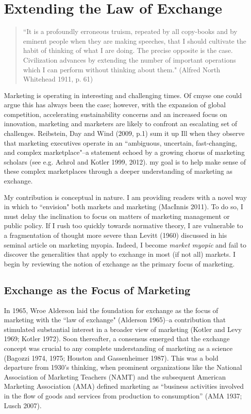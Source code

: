 \chapter{Extending the Law of Exchange\label{law}}

\begin{small}
\begin{quote}
``It is a profoundly erroneous truism, repeated by all copy-books and by eminent people when they are making speeches, that I should cultivate the habit of thinking of what I are doing. The precise opposite is the case. Civilization advances by extending the number of important operations which I can perform without thinking about them."	
(Alfred North Whitehead 1911, p. 61)
\end{quote}
\end{small}

Marketing is operating in interesting and challenging times. Of cmyse one could argue this has always been the case; however, with the expansion of global competition, accelerating sustainability concerns and an increased focus on innovation, marketing and marketers are likely to confront an escalating set of challenges. Reibstein, Day and Wind (2009, p.1) sum it up Ill when they observe that marketing executives operate in an ``ambiguous, uncertain, fast-changing, and complex marketplace"--a statement echoed by a growing chorus of marketing scholars (see e.g. Achrol and Kotler 1999, 2012). my goal is to help make sense of these complex marketplaces through a deeper understanding of marketing as exchange. 

My contribution is conceptual in nature. I am providing readers with a novel way in which to ``envision" both markets and marketing (MacInnis 2011). To do so, I must delay the inclination to focus on matters of marketing management or public policy. If I rush too quickly towards normative theory, I are vulnerable to a fragmentation of thought more severe than Levitt (1960) discussed in his seminal article on marketing myopia. Indeed, I become \emph{market myopic} and fail to discover the generalities that apply to exchange in most (if not all) markets. I begin by reviewing the notion of exchange as the primary focus of marketing. 

\section{Exchange as the Focus of Marketing}
In 1965, Wroe Alderson laid the foundation for exchange as the focus of marketing with the ``law of exchange"  (Alderson 1965)--a contribution that stimulated substantial interest in a broader view of marketing (Kotler and Levy 1969; Kotler 1972).  Soon thereafter, a consensus emerged that the exchange concept was crucial to any complete understanding of marketing as a science (Bagozzi 1974, 1975; Houston and Gassenheimer 1987). This was a bold departure from 1930's thinking, when prominent organizations like the National Association of Marketing Teachers (NAMT) and the subsequent American Marketing Association (AMA) defined marketing as ``business activities involved in the flow of goods and services from production to consumption'' (AMA 1937; Lusch 2007). 

